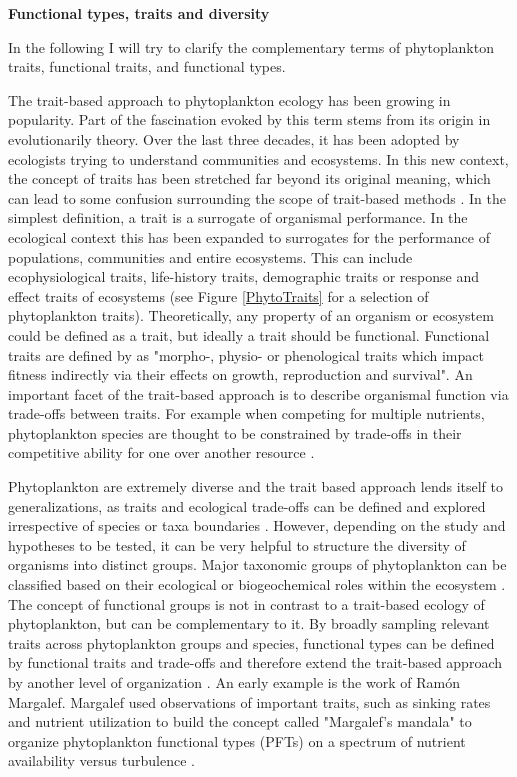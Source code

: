 \small {\textbf{Functional types, traits and diversity}}

In the following I will try to clarify the complementary terms of phytoplankton traits, functional traits, and functional types. 

The trait-based approach to phytoplankton ecology has been growing in popularity. Part of the fascination evoked by this term stems from its origin in evolutionarily theory. Over the last three decades, it has been adopted by ecologists trying to understand communities and ecosystems. In this new context, the concept of traits has been stretched far beyond its original meaning, which can lead to some confusion surrounding the scope of trait-based methods \citep{Violle2007c}. In the simplest definition, a trait is a surrogate of organismal performance. In the ecological context this has been expanded to surrogates for the performance of populations, communities and entire ecosystems. This can include ecophysiological traits, life-history traits, demographic traits or response and effect traits of ecosystems (see Figure \ref{PhytoTraits} for a selection of phytoplankton traits). Theoretically, any property of an organism or ecosystem could be defined as a trait, but ideally a trait should be functional. Functional traits are defined by \cite{Violle2007c} as "morpho-, physio- or phenological traits which impact fitness indirectly via their effects on growth, reproduction and survival". An important facet of the trait-based approach is to describe organismal function via trade-offs between traits. For example when competing for multiple nutrients, phytoplankton species are thought to be constrained by trade-offs in their competitive ability for one over another resource \citep{Tilman1990}. 

Phytoplankton are extremely diverse and the trait based approach lends itself to generalizations, as traits and ecological trade-offs can be defined and explored irrespective of species or taxa boundaries \citep{McGill2006}. However, depending on the study and hypotheses to be tested, it can be very helpful to structure the diversity of organisms into distinct groups. Major taxonomic groups of phytoplankton can be classified based on their ecological or biogeochemical roles within the ecosystem \citep{Iglesias-Rodriguez2002,Flynn2015}. The concept of functional groups is not in contrast to a trait-based ecology of phytoplankton, but can be complementary to it. By broadly sampling relevant traits across phytoplankton groups and species, functional types can be defined by functional traits and trade-offs and therefore extend the trait-based approach by another level of organization \citep{Litchman2007d}. An early example is the work of Ramón Margalef. Margalef used observations of important traits, such as sinking rates and nutrient utilization to build the concept called "Margalef's mandala" to organize phytoplankton functional types (PFTs) on a spectrum of nutrient availability versus turbulence \citep{Margalef1978}. 

